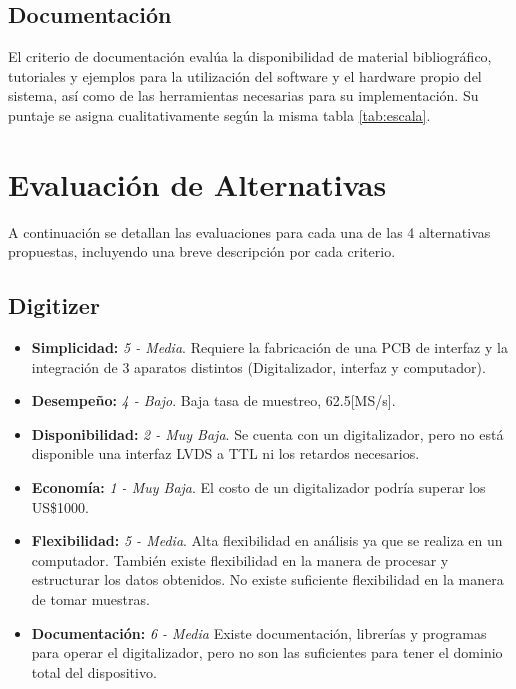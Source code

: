\subsection*{Documentación}
\par El criterio de documentación evalúa la disponibilidad de material bibliográfico, tutoriales y ejemplos para la utilización del software y el hardware propio del sistema, así como de las herramientas necesarias para su implementación. Su puntaje se asigna cualitativamente según la misma tabla \ref{tab:escala}.

\newpage
\section{Evaluación de Alternativas}
\label{evaluacion}
\par A continuación se detallan las evaluaciones para cada una de las 4 alternativas propuestas, incluyendo una breve descripción por cada criterio.
\subsection{Digitizer}
\begin{itemize}
    \item \textbf{Simplicidad:} \textit{5 - Media}. Requiere la fabricación de una PCB de interfaz y la integración de 3 aparatos distintos (Digitalizador, interfaz y computador).
    \item \textbf{Desempeño:} \textit{4 - Bajo}. Baja tasa de muestreo, 62.5[MS/s].
    \item \textbf{Disponibilidad:} \textit{2 - Muy Baja}. Se cuenta con un digitalizador, pero no está disponible una interfaz LVDS a TTL ni los retardos necesarios.
    \item \textbf{Economía:} \textit{1 - Muy Baja}. El costo de  un  digitalizador podría superar los US\$1000.
    \item \textbf{Flexibilidad:} \textit{5 - Media}. Alta flexibilidad en análisis ya que se realiza en un computador. También existe flexibilidad en la manera de procesar y estructurar los datos obtenidos. No existe suficiente flexibilidad en la manera de tomar muestras.
    \item \textbf{Documentación:} \textit{6 - Media} Existe documentación, librerías y programas para operar el digitalizador, pero no son las suficientes para tener el dominio total del dispositivo.
\end{itemize}

